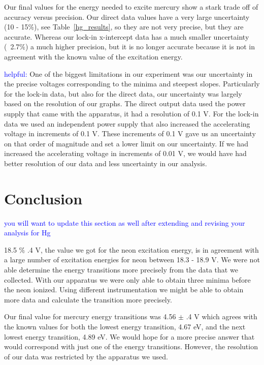 \documentclass[prb,preprint]{revtex4-1}
\begin{document}
Our final values for the energy needed to excite mercury show a stark trade off of accuracy versus precision. Our direct data values have a very large uncertainty (10 - 15$\%$), see Table~\ref{hg_results}, so they are not very precise, but they are accurate. Whereas our lock-in x-intercept data has a much smaller uncertainty (~2.7$\%$) a much higher precision, but it is no longer accurate because it is not in agreement with the known value of the excitation energy.

\textcolor{blue}{helpful:} One of the biggest limitations in our experiment was our uncertainty in the precise voltages corresponding to the minima and steepest slopes. Particularly for the lock-in data, but also for the direct data, our uncertainty was largely based on the resolution of our graphs. The direct output data used the power supply that came with the apparatus, it had a resolution of 0.1 V. For the lock-in data we used an independent power supply that also increased the accelerating voltage in increments of 0.1 V. These increments of 0.1 V gave us an uncertainty on that order of magnitude and set a lower limit on our uncertainty. If we had increased the accelerating voltage in increments of 0.01 V, we would have had better resolution of our data and less uncertainty in our analysis. 

\section{Conclusion}

\textcolor{blue}{you will want to update this section as well after extending and revising your analysis for Hg}

18.5 $\%$ .4 V, the value we got for the neon excitation energy, is in agreement with a large number of excitation energies for neon between 18.3 - 18.9 V. We were not able determine the energy transitions more precisely from the data that we collected. With our apparatus we were only able to obtain three minima before the neon ionized. Using different instrumentation we might be able to obtain more data and calculate the transition more precisely.

Our final value for mercury energy transitions was 4.56 $\pm$ .4 V which agrees with the known values for both the lowest energy transition, 4.67 eV, and the next lowest energy transition, 4.89 eV. We would hope for a more precise answer that would correspond with just one of the energy transitions. However, the resolution of our data was restricted by the apparatus we used.
\end{document}
